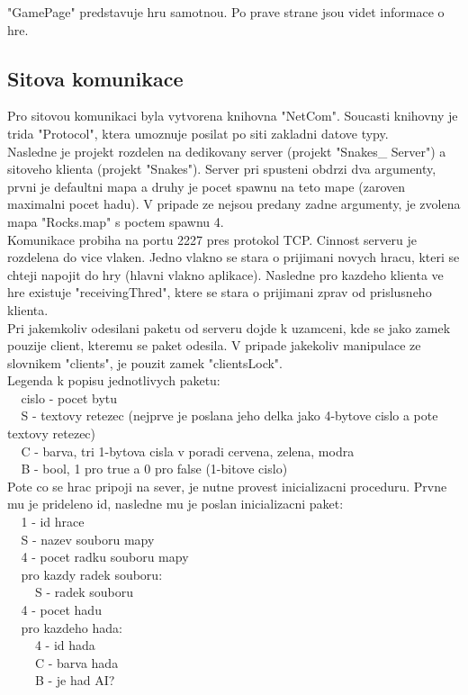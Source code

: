 \documentclass{article}
\newcommand{\s}{$~~~~~$}
\begin{document}
"GamePage" predstavuje hru samotnou. Po prave strane jsou videt informace o hre.\\

\subsection*{Sitova komunikace}
Pro sitovou komunikaci byla vytvorena knihovna "NetCom". Soucasti knihovny je trida "Protocol", ktera umoznuje posilat po siti zakladni datove typy.\\

Nasledne je projekt rozdelen na dedikovany server (projekt "Snakes\_ Server") a sitoveho klienta (projekt "Snakes"). Server pri spusteni obdrzi dva argumenty, prvni je defaultni mapa a druhy je pocet spawnu na teto mape (zaroven maximalni pocet hadu). V pripade ze nejsou predany zadne argumenty, je zvolena mapa "Rocks.map" s poctem spawnu 4.\\

Komunikace probiha na portu 2227 pres protokol TCP. Cinnost serveru je rozdelena do vice vlaken. Jedno vlakno se stara o prijimani novych hracu, kteri se chteji napojit do hry (hlavni vlakno aplikace). Nasledne pro kazdeho klienta ve hre existuje "receivingThred", ktere se stara o prijimani zprav od prislusneho klienta.\\

Pri jakemkoliv odesilani paketu od serveru dojde k uzamceni, kde se jako zamek pouzije client, kteremu se paket odesila. V pripade jakekoliv manipulace ze slovnikem "clients", je pouzit zamek "clientsLock".\\

\noindent Legenda k popisu jednotlivych paketu:\\
\s cislo - pocet bytu\\
\s S - textovy retezec (nejprve je poslana jeho delka jako 4-bytove cislo a pote textovy retezec)\\
\s C - barva, tri 1-bytova cisla v poradi cervena, zelena, modra\\
\s B - bool, 1 pro true a 0 pro false (1-bitove cislo)\\

Pote co se hrac pripoji na sever, je nutne provest inicializacni proceduru. Prvne mu je prideleno id, nasledne mu je poslan inicializacni paket:\\
\s 1 - id hrace\\
\s S - nazev souboru mapy\\
\s 4 - pocet radku souboru mapy\\
\s pro kazdy radek souboru:\\
\s\s S - radek souboru\\
\s 4 - pocet hadu\\
\s pro kazdeho hada:\\
\s\s 4 - id hada\\
\s\s C - barva hada\\
\s\s B - je had AI?\\
\end{document}

